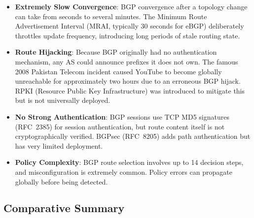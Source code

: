 \documentclass[12pt,a4paper]{article}
\begin{document}
\begin{warningbox}
\begin{itemize}[itemsep=4pt]
  \item \textbf{Extremely Slow Convergence}: BGP convergence after a topology
  change can take from seconds to several minutes. The Minimum Route
  Advertisement Interval (MRAI, typically 30 seconds for eBGP) deliberately
  throttles update frequency, introducing long periods of stale routing state.

  \item \textbf{Route Hijacking}: Because BGP originally had no authentication
  mechanism, any AS could announce prefixes it does not own. The famous 2008
  Pakistan Telecom incident caused YouTube to become globally unreachable for
  approximately two hours due to an erroneous BGP hijack. RPKI (Resource Public
  Key Infrastructure) was introduced to mitigate this but is not universally
  deployed.

  \item \textbf{No Strong Authentication}: BGP sessions use TCP MD5 signatures
  (RFC~2385) for session authentication, but route content itself is not
  cryptographically verified. BGPsec (RFC~8205) adds path authentication but
  has very limited deployment.

  \item \textbf{Policy Complexity}: BGP route selection involves up to 14
  decision steps, and misconfiguration is extremely common. Policy errors can
  propagate globally before being detected.
\end{itemize}
\end{warningbox}

\subsection{Comparative Summary}
\end{document}
